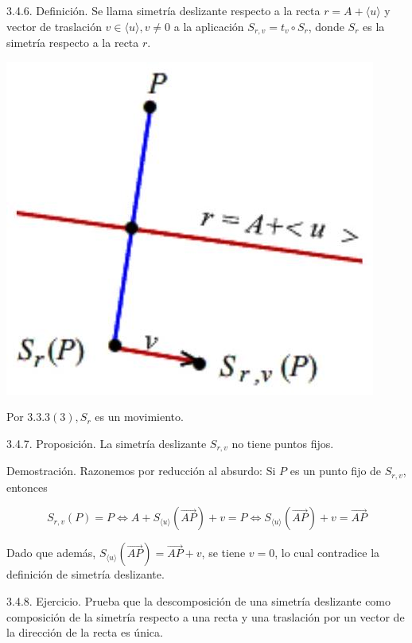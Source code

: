 \documentclass[12pt, a4paper, ones, notitlepage, openany,titlepage]{article}
\begin{document}
3.4.6. Definición. Se llama simetría deslizante respecto a la recta $r=A+\langle u\rangle$ y vector de traslación $v \in\langle u\rangle, v \neq 0$ a la aplicación $S_{r, v}=t_{v} \circ S_{r}$, donde $S_{r}$ es la simetría respecto a la recta $r$.

\begin{center}
	\includegraphics[max width=\textwidth]{2023_04_25_301d1803eaf1bc74cfd9g-081}
\end{center}

Por $3.3 .3(3), S_{r}$ es un movimiento.

3.4.7. Proposición. La simetría deslizante $S_{r, v}$ no tiene puntos fijos.

Demostración. Razonemos por reducción al absurdo: Si $P$ es un punto fijo de $S_{r, v}$, entonces

$$
S_{r, v}(P)=P \Longleftrightarrow A+S_{\langle u\rangle}(\overrightarrow{A P})+v=P \Longleftrightarrow S_{\langle u\rangle}(\overrightarrow{A P})+v=\overrightarrow{A P}
$$

Dado que además, $S_{\langle u\rangle}(\overrightarrow{A P})=\overrightarrow{A P}+v$, se tiene $v=0$, lo cual contradice la definición de simetría deslizante.

3.4.8. Ejercicio. Prueba que la descomposición de una simetría deslizante como composición de la simetría respecto a una recta y una traslación por un vector de la dirección de la recta es única.
\end{document}
